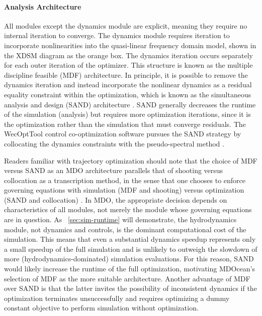 \paragraph{Analysis Architecture}
All modules except the dynamics module are explicit, meaning they require no internal iteration to converge.
The dynamics module requires iteration to incorporate nonlinearities into the quasi-linear frequency domain model, shown in the XDSM diagram as the orange box.
The dynamics iteration occurs separately for each outer iteration of the optimizer.
This structure is known as the multiple discipline feasible (MDF) architecture.
In principle, it is possible to remove the dynamics iteration and instead incorporate the nonlinear dynamics as a residual equality constraint within the optimization, which is known as the simultaneous analysis and design (SAND) architecture \cite{martins_multidisciplinary_2013}.
SAND generally decreases the runtime of the simulation (analysis) but requires more optimization iterations, since it is the optimization rather than the simulation that must converge residuals. 
The WecOptTool control co-optimization software pursues the SAND strategy by collocating the dynamics constraints with the pseudo-spectral method \cite{coe_initial_2020}.

Readers familiar with trajectory optimization should note that the choice of MDF versus SAND as an MDO architecture parallels that of shooting versus collocation as a transcription method, in the sense that one chooses to enforce governing equations with simulation (MDF and shooting) versus optimization (SAND and collocation) \cite{underactuated}.
In MDO, the appropriate decision depends on characteristics of all modules, not merely the module whose governing equations are in question.
As \sectionautorefname~\ref{sec:sim-runtime} will demonstrate, the hydrodynamics module, not dynamics and controls, is the dominant computational cost of the simulation.
This means that even a substantial dynamics speedup represents only a small speedup of the full simulation and is unlikely to outweigh the slowdown of more (hydrodynamics-dominated) simulation evaluations.
For this reason, SAND would likely increase the runtime of the full optimization, motivating MDOcean's selection of MDF as the more suitable architecture.
Another advantage of MDF over SAND is that the latter invites the possibility of inconsistent dynamics if the optimization terminates unsuccessfully \cite{martins_multidisciplinary_2013} and requires optimizing a dummy constant objective to perform simulation without optimization.

